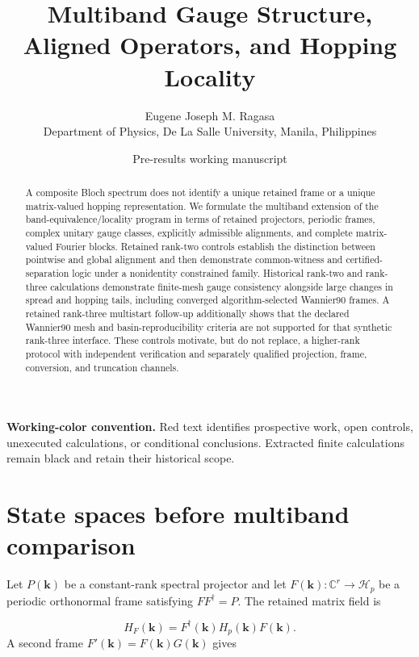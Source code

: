 \documentclass[11pt]{article}
\title{\textbf{Multiband Gauge Structure, Aligned Operators, and Hopping Locality}}
\author{Eugene Joseph M. Ragasa\\Department of Physics, De La Salle University, Manila, Philippines}
\date{Pre-results working manuscript}
\newenvironment{prospective}{\color{prospectivered}}{}
\begin{document}
\maketitle

\begin{prospective}
\noindent\textbf{Working-color convention.} Red text identifies prospective work,
open controls, unexecuted calculations, or conditional conclusions. Extracted finite
calculations remain black and retain their historical scope.
\end{prospective}

\begin{abstract}
A composite Bloch spectrum does not identify a unique retained frame or a unique
matrix-valued hopping representation. We formulate the multiband extension of the
band-equivalence/locality program in terms of retained projectors, periodic frames,
complex unitary gauge classes, explicitly admissible alignments, and complete
matrix-valued Fourier blocks. Retained rank-two controls establish the distinction
between pointwise and global alignment and then demonstrate common-witness and
certified-separation logic under a nonidentity constrained family. Historical rank-two
and rank-three calculations demonstrate finite-mesh gauge consistency alongside large
changes in spread and hopping tails, including converged algorithm-selected Wannier90
frames. A retained rank-three multistart follow-up additionally shows
that the declared Wannier90 mesh and basin-reproducibility criteria are not supported for
that synthetic rank-three interface. These controls motivate, but do not replace, a
higher-rank protocol with independent verification and
separately qualified projection, frame, conversion, and truncation channels.
\end{abstract}

\section{State spaces before multiband comparison}
Let $P(\mathbf k)$ be a constant-rank spectral projector and let $F(\mathbf k):\mathbb C^r\to\mathcal H_p$ be a periodic orthonormal frame satisfying $F F^\dagger=P$. The retained matrix field is

\begin{equation}
H_F(\mathbf k)=F^\dagger(\mathbf k)H_p(\mathbf k)F(\mathbf k).
\end{equation}
A second frame $F'(\mathbf k)=F(\mathbf k)G(\mathbf k)$ gives
\end{document}
